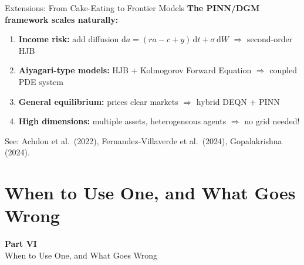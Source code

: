 \documentclass[aspectratio=169,11pt]{beamer}
\begin{document}
\begin{frame}{Extensions: From Cake-Eating to Frontier Models}
\textbf{The PINN/DGM framework scales naturally:}

\vspace{0.3em}
\begin{enumerate}
    \item \textbf{Income risk:} add diffusion $\mathrm{d}a = (ra - c + y)\,\mathrm{d}t + \sigma\,\mathrm{d}W$
    \quad$\Rightarrow$ second-order HJB

    \vspace{0.2em}
    \item \textbf{Aiyagari-type models:} HJB + Kolmogorov Forward Equation
    \quad$\Rightarrow$ coupled PDE system

    \vspace{0.2em}
    \item \textbf{General equilibrium:} prices clear markets
    \quad$\Rightarrow$ hybrid DEQN + PINN

    \vspace{0.2em}
    \item \textbf{High dimensions:} multiple assets, heterogeneous agents
    \quad$\Rightarrow$ no grid needed!
\end{enumerate}

\vspace{0.3em}
{\small See: Achdou et al.\ (2022), Fernandez-Villaverde et al.\ (2024), Gopalakrishna (2024).}
\end{frame}


\section{When to Use One, and What Goes Wrong}

\begin{frame}{}
\vfill
\begin{center}
{\Huge \textcolor{uzhblue}{\textbf{Part VI}}}\\[12pt]
{\LARGE When to Use One, and What Goes Wrong}
\end{center}
\vfill
\end{frame}
\end{document}
